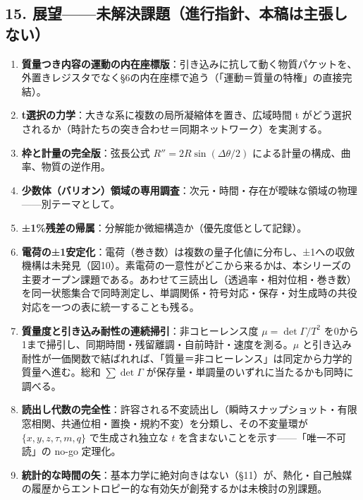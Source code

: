 \documentclass[
  a4paper,
]{ltjsarticle}
\providecommand{\tightlist}{%
  \setlength{\itemsep}{0pt}\setlength{\parskip}{0pt}}
\begin{document}
\subsection{15.
展望------未解決課題（進行指針、本稿は主張しない）}\label{ux5c55ux671bux672aux89e3ux6c7aux8ab2ux984cux9032ux884cux6307ux91ddux672cux7a3fux306fux4e3bux5f35ux3057ux306aux3044}

\begin{enumerate}
\def\labelenumi{\arabic{enumi}.}
\tightlist
\item
  \textbf{質量つき内容の運動の内在座標版}：引き込みに抗して動く物質パケットを、外置きレジスタでなく§6の内在座標で追う（「運動＝質量の特権」の直接完結）。
\item
  \textbf{t選択の力学}：大きな系に複数の局所凝縮体を置き、広域時間 t
  がどう選択されるか（時計たちの突き合わせ＝同期ネットワーク）を実測する。
\item
  \textbf{枠と計量の完全版}：弦長公式 \(R''=2R\sin(\Delta\theta/2)\)
  による計量の構成、曲率、物質の逆作用。
\item
  \textbf{少数体（バリオン）領域の専用調査}：次元・時間・存在が曖昧な領域の物理------別テーマとして。
\item
  \textbf{±1\%残差の帰属}：分解能か微細構造か（優先度低として記録）。
\item
  \textbf{電荷の±1安定化}：電荷（巻き数）は複数の量子化値に分布し、±1への収斂機構は未発見（図10）。素電荷の一意性がどこから来るかは、本シリーズの主要オープン課題である。あわせて三読出し（透過率・相対位相・巻き数）を同一状態集合で同時測定し、単調関係・符号対応・保存・対生成時の共役対応を一つの表に統一することも残る。
\item
  \textbf{質量度と引き込み耐性の連続掃引}：非コヒーレンス度
  \(\mu=\det\Gamma/T^2\)
  を0から1まで掃引し、同期時間・残留離調・自前時計・速度を測る。\(\mu\)
  と引き込み耐性が一価関数で結ばれれば、「質量＝非コヒーレンス」は同定から力学的質量へ進む。総和
  \(\sum \det\Gamma\) が保存量・単調量のいずれに当たるかも同時に調べる。
\item
  \textbf{読出し代数の完全性}：許容される不変読出し（瞬時スナップショット・有限窓相関、共通位相・置換・規約不変）を分類し、その不変量環が
  \(\{x,y,z,\tau,m,q\}\) で生成され独立な \(t\)
  を含まないことを示す------「唯一不可読」の no-go 定理化。
\item
  \textbf{統計的な時間の矢}：基本力学に絶対向きはない（§11）が、熱化・自己触媒の履歴からエントロピー的な有効矢が創発するかは未検討の別課題。
\end{enumerate}
\end{document}

